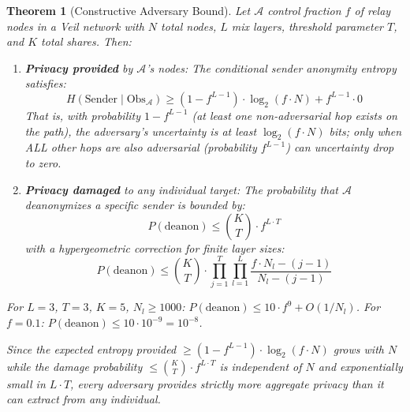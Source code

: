 \documentclass[11pt,a4paper]{article}
\newtheorem{theorem}{Theorem}
\newcommand{\Adv}{\mathcal{A}}
\begin{document}
\begin{theorem}[Constructive Adversary Bound]
\label{thm:constructive}
Let $\Adv$ control fraction $f$ of relay nodes in a Veil network with $N$ total nodes, $L$ mix layers, threshold parameter $T$, and $K$ total shares. Then:
\begin{enumerate}
    \item \textbf{Privacy provided} by $\Adv$'s nodes: The conditional sender anonymity entropy satisfies:
    \begin{equation}
        H(\text{Sender} \mid \text{Obs}_\Adv) \geq (1 - f^{L-1}) \cdot \log_2(f \cdot N) + f^{L-1} \cdot 0
    \end{equation}
    That is, with probability $1 - f^{L-1}$ (at least one non-adversarial hop exists on the path), the adversary's uncertainty is at least $\log_2(f \cdot N)$ bits; only when ALL other hops are also adversarial (probability $f^{L-1}$) can uncertainty drop to zero.

    \item \textbf{Privacy damaged} to any individual target: The probability that $\Adv$ deanonymizes a specific sender is bounded by:
    \begin{equation}
        P(\text{deanon}) \leq \binom{K}{T} \cdot f^{L \cdot T}
    \end{equation}
    with a hypergeometric correction for finite layer sizes:
    \begin{equation}
        P(\text{deanon}) \leq \binom{K}{T} \cdot \prod_{j=1}^{T} \prod_{l=1}^{L} \frac{f \cdot N_l - (j-1)}{N_l - (j-1)}
    \end{equation}
\end{enumerate}

For $L = 3$, $T = 3$, $K = 5$, $N_l \geq 1000$: $P(\text{deanon}) \leq 10 \cdot f^9 + O(1/N_l)$.
For $f = 0.1$: $P(\text{deanon}) \leq 10 \cdot 10^{-9} = 10^{-8}$.

Since the expected entropy provided $\geq (1-f^{L-1}) \cdot \log_2(f \cdot N)$ grows with $N$ while the damage probability $\leq \binom{K}{T} \cdot f^{L \cdot T}$ is independent of $N$ and exponentially small in $L \cdot T$, every adversary provides strictly more aggregate privacy than it can extract from any individual.
\end{theorem}
\end{document}
